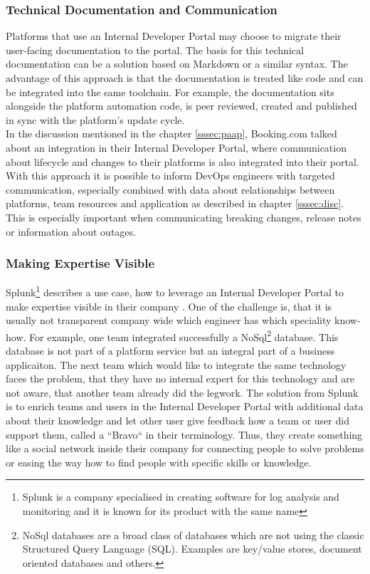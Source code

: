 \documentclass[a4paper,12pt]{article}
\begin{document}
    \subsubsection{Technical Documentation and Communication}
    \label{sssec:techdoc}
    Platforms that use an Internal Developer Portal may choose to migrate their user-facing documentation to the portal.
    The basis for this technical documentation can be a solution based on Markdown\parencite{backstagetechdocs}
    or a similar syntax.
    The advantage of this approach is that the documentation is treated like code and can be integrated into the same toolchain.
    For example, the documentation sits alongside the platform automation code, is peer reviewed, created
    and published in sync with the platform's update cycle.\\
    In the discussion mentioned in the chapter \ref{sssec:paap}, Booking.com talked about an integration in their Internal
    Developer Portal, where communication about lifecycle and changes to their platforms is also integrated into their portal.
    With this approach it is possible to inform DevOps engineers with targeted communication, especially combined with data about relationships
    between platforms, team resources and application as described in chapter \ref{sssec:disc}.
    This is especially important when communicating breaking changes, release notes or information about outages.

    \subsubsection{Making Expertise Visible}
    \label{sssec:expertise}
    Splunk\footnote{Splunk is a company specialised in creating software for log analysis and monitoring and it is known
    for its product with the same name}
    describes a use case, how to leverage an Internal Developer Portal to make expertise visible in their
    company\parencite{splunkidp} .
    One of the challenge is, that it is usually not transparent company wide which engineer has which speciality know-how.
    For example, one team integrated successfully a NoSql\footnote{NoSql databases are a broad class of databases which
    are not using the classic Structured Query Language (SQL). Examples are key/value stores, document oriented
    databases and others.  } database.
    This database is not part of a platform service but an integral part of a business applicaiton.
    The next team which would like to integrate the same technology faces the problem, that they have no internal
    expert for this technology and are not aware, that another team already did the legwork.
    The solution from Splunk is to enrich teams and users in the Internal Developer Portal with additional data about
    their knowledge and let other user give feedback how a team or user did support them, called a ``Bravo`` in their terminology.
    Thus, they create something like a social network inside their company for connecting people to solve problems or
    easing the way how to find people with specific skills or knowledge.
\end{document}
